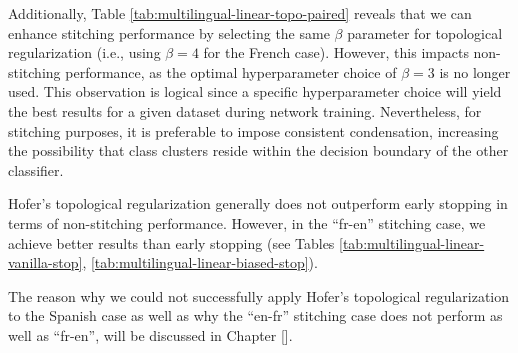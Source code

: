 \documentclass[../main.tex]{subfiles}
\begin{document}
\begin{table}[ht!]
\centering
{}
\caption{Topological reg. w/ matched params (over two random seeds)}
\label{tab:multilingual-linear-topo-paired}
\end{table}

Additionally, Table \ref{tab:multilingual-linear-topo-paired} reveals that we can enhance stitching performance by selecting the same $\beta$ parameter for topological regularization (i.e., using $\beta=4$ for the French case). However, this impacts non-stitching performance, as the optimal hyperparameter choice of $\beta=3$ is no longer used. This observation is logical since a specific hyperparameter choice will yield the best results for a given dataset during network training. Nevertheless, for stitching purposes, it is preferable to impose consistent condensation, increasing the possibility that class clusters reside within the decision boundary of the other classifier.

\begin{note_math}
Hofer's topological regularization generally does not outperform early stopping in terms of non-stitching performance. However, in the ``fr-en'' stitching case, we achieve better results than early stopping (see Tables \ref{tab:multilingual-linear-vanilla-stop}, \ref{tab:multilingual-linear-biased-stop}).
\end{note_math}

The reason why we could not successfully apply Hofer's topological regularization to the Spanish case as well as why the ``en-fr'' stitching case does not perform as well as ``fr-en'', will be discussed in Chapter [].\\
\end{document}
